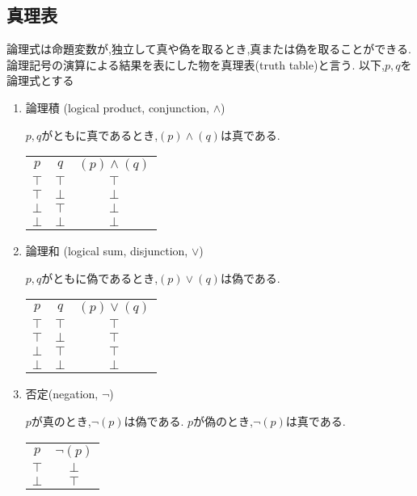 \subsection{真理表}
論理式は命題変数が,独立して真や偽を取るとき,真または偽を取ることができる.
論理記号の演算による結果を表にした物を真理表(truth table)と言う.
以下,$p,q$を論理式とする
\begin{enumerate}
 \item 論理積 (logical product, conjunction, $\land$)

   $p,q$がともに真であるとき,$(p) \land (q)$は真である.

	   \begin{tabular}{|c c||c|}
		\hline
		$p$    & $q$    & $(p) \land (q)$ \\
		\hhline{|==#=|}
		$\top$ & $\top$ & $\top$ \\
		\hline
		$\top$ & $\bot$ & $\bot$ \\
		\hline
		$\bot$ & $\top$ & $\bot$ \\
		\hline
		$\bot$ & $\bot$ & $\bot$ \\
		\hline
	   \end{tabular}

 \item 論理和 (logical sum, disjunction, $\lor$)

	   $p,q$がともに偽であるとき,$(p) \lor (q)$は偽である.

	   \begin{tabular}{|c c||c|}
		\hline
		$p$    & $q$    & $(p) \lor (q)$ \\
		\hhline{|==#=|}
		$\top$ & $\top$ & $\top$ \\
		\hline
		$\top$ & $\bot$ & $\top$ \\
		\hline
		$\bot$ & $\top$ & $\top$ \\
		\hline
		$\bot$ & $\bot$ & $\bot$ \\
		\hline
	   \end{tabular}

 \item 否定(negation, $\lnot$)

	   $p$が真のとき,$\lnot (p)$は偽である.
	   $p$が偽のとき,$\lnot (p)$は真である.

	   \begin{tabular}{|c||c|}
		\hline
		$p$    & $\lnot (p) $ \\
		\hhline{|=#=|}
		$\top$ & $\bot$ \\
		\hline
		$\bot$ & $\top$ \\
		\hline
	   \end{tabular}


\end{enumerate}
